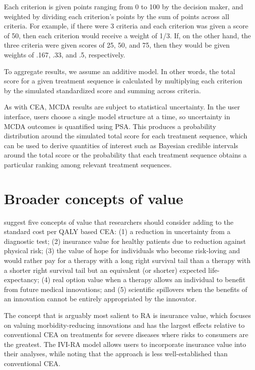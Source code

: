 \documentclass[11pt,final,fleqn]{article}\usepackage[]{graphicx}\usepackage[]{color}
\theoremstyle{plain}
\begin{document}
Each criterion is given points ranging from 0 to 100 by the decision maker, and weighted by dividing each criterion's points by the sum of points across all criteria. For example, if there were 3 criteria and each criterion was given a score of 50, then each criterion would receive a weight of 1/3. If, on the other hand, the three criteria were given scores of 25, 50, and 75, then they would be given weights of .167, .33, and .5, respectively. 

To aggregate results, we assume an additive model. In other words, the total score for a given treatment sequence is calculated by multiplying each criterion by the simulated standardized score and summing across criteria.

As with CEA, MCDA results are subject to statistical uncertainty. In the user interface, users choose a single model structure at a time, so uncertainty in MCDA outcomes is quantified using PSA. This produces a probability distribution around the simulated total score for each treatment sequence, which can be used to derive quantities of interest such as Bayesian credible intervals around the total score or the probability that each treatment sequence obtains a particular ranking among relevant treatment sequences.

\section{Broader concepts of value}\label{sec:braoder-value}
\citet{garrison2017toward} suggest five concepts of value that researchers should consider adding to the standard cost per QALY based CEA: (1) a reduction in uncertainty from a diagnostic test; (2) insurance value for healthy patients due to reduction against physical risk; (3) the value of hope for individuals who become risk-loving and would rather pay for a therapy with a long right survival tail than a therapy with a shorter right survival tail but an equivalent (or shorter) expected life-expectancy; (4) real option value when a therapy allows an individual to benefit from future medical innovations; and (5) scientific spillovers when the benefits of an innovation cannot be entirely appropriated by the innovator. 

The concept that is arguably most salient to RA is insurance value, which focuses on valuing morbidity-reducing innovations and has the largest effects relative to conventional CEA on treatments for severe diseases where risks to consumers are the greatest. The IVI-RA model allows users to incorporate insurance value into their analyses, while noting that the approach is less well-established than conventional CEA. 
\end{document}
